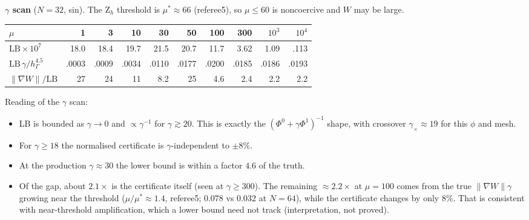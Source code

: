 \documentclass[11pt]{article}
\theoremstyle{remark}
\newcommand{\hG}{h_\Gamma}
\begin{document}
\noindent\textbf{$\gamma$ scan} ($N=32$, sin). The Z$_h$ threshold is $\mu^\ast\approx66$ (referee5), so $\mu\le60$ is
noncoercive and $W$ may be large.

\smallskip
\begin{tabular}{lrrrrrrrrr}\toprule
$\mu$ & 1 & 3 & 10 & 30 & 50 & 100 & 300 & $10^3$ & $10^4$\\\midrule
$\mathrm{LB}\times10^{7}$ & 18.0 & 18.4 & 19.7 & 21.5 & 20.7 & 11.7 & 3.62 & 1.09 & .113\\
$\mathrm{LB}\,\gamma/\hG^{4.5}$ & .0003 & .0009 & .0034 & .0110 & .0177 & .0200 & .0185 & .0186 & .0193\\
$\|\nabla W\|/\mathrm{LB}$ & 27 & 24 & 11 & 8.2 & 25 & 4.6 & 2.4 & 2.2 & 2.2\\\bottomrule
\end{tabular}
\smallskip

\noindent Reading of the $\gamma$ scan:
\begin{itemize}
\item LB is bounded as $\gamma\to0$ and $\propto\gamma^{-1}$ for $\gamma\gtrsim20$. This is exactly the $(\Phi^0+\gamma\Phi^1)^{-1}$
shape, with crossover $\gamma_\times\approx19$ for this $\phi$ and mesh.
\item For $\gamma\ge18$ the normalised certificate is $\gamma$-independent to $\pm8\%$.
\item At the production $\gamma\approx30$ the lower bound is within a factor $4.6$ of the truth.
\item Of the gap, about $2.1\times$ is the certificate itself (seen at $\gamma\ge300$). The remaining $\approx2.2\times$ at
$\mu=100$ comes from the true $\|\nabla W\|\gamma$ growing near the threshold ($\mu/\mu^\ast\approx1.4$, referee5; $0.078$ vs
$0.032$ at $N=64$), while the certificate changes by only $8\%$. That is consistent with near-threshold amplification, which a
lower bound need not track (interpretation, not proved).
\end{itemize}
\end{document}
